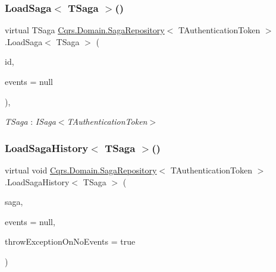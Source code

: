 \subsubsection{\texorpdfstring{Load\+Saga$<$ T\+Saga $>$()}{LoadSaga< TSaga >()}}
{\footnotesize\ttfamily virtual T\+Saga \hyperlink{classCqrs_1_1Domain_1_1SagaRepository}{Cqrs.\+Domain.\+Saga\+Repository}$<$ T\+Authentication\+Token $>$.Load\+Saga$<$ T\+Saga $>$ (\begin{DoxyParamCaption}\item[{Guid}]{id,  }\item[{I\+List$<$ \hyperlink{interfaceCqrs_1_1Events_1_1ISagaEvent}{I\+Saga\+Event}$<$ T\+Authentication\+Token $>$$>$}]{events = {\ttfamily null} }\end{DoxyParamCaption})\hspace{0.3cm}{\ttfamily [protected]}, {\ttfamily [virtual]}}

\begin{Desc}
\item[Type Constraints]\begin{description}
\item[{\em T\+Saga} : {\em I\+Saga$<$T\+Authentication\+Token$>$}]\end{description}
\end{Desc}
\mbox{\label{classCqrs_1_1Domain_1_1SagaRepository_af6af9066681e47bc4ff2e14358321fb8}} 
\subsubsection{\texorpdfstring{Load\+Saga\+History$<$ T\+Saga $>$()}{LoadSagaHistory< TSaga >()}}
{\footnotesize\ttfamily virtual void \hyperlink{classCqrs_1_1Domain_1_1SagaRepository}{Cqrs.\+Domain.\+Saga\+Repository}$<$ T\+Authentication\+Token $>$.Load\+Saga\+History$<$ T\+Saga $>$ (\begin{DoxyParamCaption}\item[{T\+Saga}]{saga,  }\item[{I\+List$<$ \hyperlink{interfaceCqrs_1_1Events_1_1ISagaEvent}{I\+Saga\+Event}$<$ T\+Authentication\+Token $>$$>$}]{events = {\ttfamily null},  }\item[{bool}]{throw\+Exception\+On\+No\+Events = {\ttfamily true} }\end{DoxyParamCaption})\hspace{0.3cm}{\ttfamily [virtual]}}

